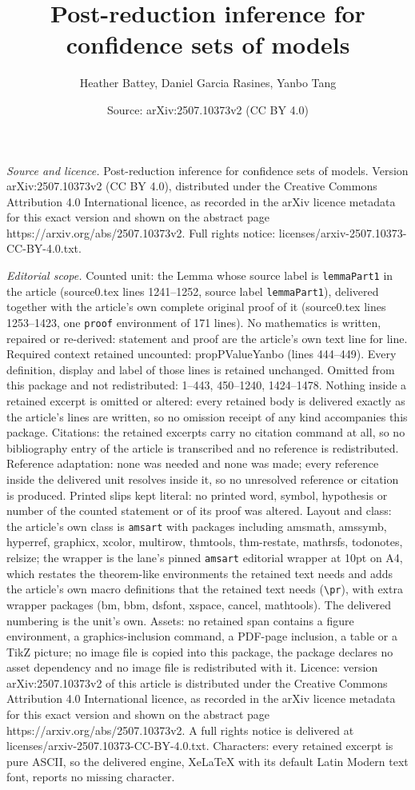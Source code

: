 \documentclass[10pt,a4paper]{amsart}
\title[Post-reduction inference for confidence sets of models]{Post-reduction inference for confidence sets of models}
\author{Heather Battey, Daniel Garcia Rasines, Yanbo Tang}
\date{Source: arXiv:2507.10373v2 (CC BY 4.0)}
\begin{document}
\maketitle

\noindent\emph{Source and licence.} Post-reduction inference for confidence sets of models. Version arXiv:2507.10373v2 (CC BY 4.0), distributed under the Creative Commons Attribution 4.0 International licence, as recorded in the arXiv licence metadata for this exact version and shown on the abstract page https://arxiv.org/abs/2507.10373v2. Full rights notice: licenses/arxiv-2507.10373-CC-BY-4.0.txt.\par\smallskip

\noindent\textit{Editorial scope.} Counted unit: the Lemma whose source label is \texttt{lemmaPart1} in the article (source0.tex lines 1241--1252, source label \texttt{lemmaPart1}), delivered together with the article's own complete original proof of it (source0.tex lines 1253--1423, one \texttt{proof} environment of 171 lines). No mathematics is written, repaired or re-derived: statement and proof are the article's own text line for line. Required context retained uncounted: propPValueYanbo (lines 444--449). Every definition, display and label of those lines is retained unchanged. Omitted from this package and not redistributed: 1--443, 450--1240, 1424--1478. Nothing inside a retained excerpt is omitted or altered: every retained body is delivered exactly as the article's lines are written, so no omission receipt of any kind accompanies this package. Citations: the retained excerpts carry no citation command at all, so no bibliography entry of the article is transcribed and no reference is redistributed. Reference adaptation: none was needed and none was made; every reference inside the delivered unit resolves inside it, so no unresolved reference or citation is produced. Printed slips kept literal: no printed word, symbol, hypothesis or number of the counted statement or of its proof was altered. Layout and class: the article's own class is \texttt{amsart} with packages including amsmath, amssymb, hyperref, graphicx, xcolor, multirow, thmtools, thm-restate, mathrsfs, todonotes, relsize; the wrapper is the lane's pinned \texttt{amsart} editorial wrapper at 10pt on A4, which restates the theorem-like environments the retained text needs and adds the article's own macro definitions that the retained text needs (\texttt{\textbackslash pr}), with extra wrapper packages (bm, bbm, dsfont, xspace, cancel, mathtools). The delivered numbering is the unit's own. Assets: no retained span contains a figure environment, a graphics-inclusion command, a PDF-page inclusion, a table or a TikZ picture; no image file is copied into this package, the package declares no asset dependency and no image file is redistributed with it. Licence: version arXiv:2507.10373v2 of this article is distributed under the Creative Commons Attribution 4.0 International licence, as recorded in the arXiv licence metadata for this exact version and shown on the abstract page https://arxiv.org/abs/2507.10373v2. A full rights notice is delivered at licenses/arxiv-2507.10373-CC-BY-4.0.txt. Characters: every retained excerpt is pure ASCII, so the delivered engine, XeLaTeX with its default Latin Modern text font, reports no missing character.
\end{document}
